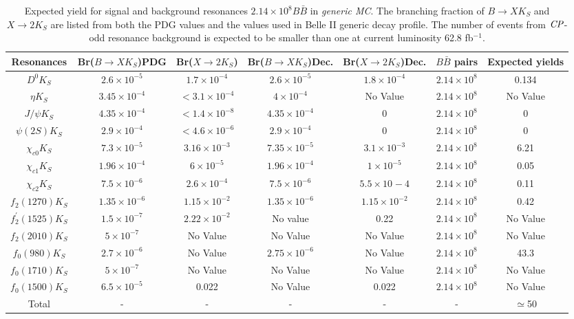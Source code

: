 \begin{table}
	\caption{Expected yield for signal and background resonances $2.14\times 10^8 B\bar{B}$ in \textit{generic MC}. The branching fraction of $B\to X K_S$ and $X \to 2K_S$ are listed from both the PDG values and the values used in Belle II generic decay profile. The number of events from $\it{CP}$-odd resonance background is expected to be smaller than one at current luminosity 62.8 fb$^{-1}$.}
	\label{tab:f_res}
	\centering
	\begin{tabular}{|c|c|c|c|c|c|c|}
		\hline
		Resonances & Br($B \to X K_S$)PDG  & Br($X \to2K_S$) & Br($B \to X K_S$)Dec. & Br($X \to2K_S$)Dec. & $B\bar{B}$ pairs & Expected yields \\
		\hline
		$D^0 K_S$ & $2.6 \times 10^{-5}$ & $1.7\times 10^{-4}$ & $2.6 \times 10^{-5}$ & $1.8\times 10^{-4}$ & $2.14\times 10^8$ & 0.134 \\
		\hline
		$\eta K_S$ & $3.45\times 10^{-4}$ & $<3.1\times 10^{-4}$ & $4\times 10^{-4}$ & No Value & $2.14\times 10^8$ & No Value  \\
		\hline
		$J/\psi K_S$ & $4.35\times 10^{-4}$ & $<1.4\times 10^{-8}$ & $4.35\times 10^{-4}$ & 0 & $2.14\times 10^8$ & 0 \\
		\hline
		$\psi(2S)K_S$ & $2.9\times 10^{-4}$ & $<4.6\times 10^{-6}$ & $2.9\times 10^{-4}$ & 0 & $2.14\times 10^8$ & 0 \\
		\hline
		$\chi_{c0}K_S$ & $7.3\times 10^{-5}$ & $3.16\times 10^{-3}$ & $7.35\times 10^{-5}$ & $3.1\times 10^{-3}$ & $2.14\times 10^8$ & 6.21 \\
		\hline
		$\chi_{c1}K_S$ & $1.96\times 10^{-4}$ & $6\times 10^{-5}$ & $1.96\times 10^{-4}$ & $1\times 10^{-5}$ & $2.14\times 10^8$ & 0.05 \\
		\hline
		$\chi_{c2}K_S$ & $7.5\times 10^{-6}$ & $2.6\times 10^{-4}$ & $7.5\times 10^{-6}$ & $5.5\times 10^{}-4$ & $2.14\times 10^8$ & 0.11 \\
		\hline
		$f_2(1270)K_S$ & $1.35\times 10^{-6}$ & $1.15\times 10^{-2}$ & $1.35\times 10^{-6}$ & $1.15\times 10^{-2}$ & $2.14\times 10^8$ & 0.42 \\
		\hline
		$f_{2}^{'}(1525)K_S$ & $1.5\times 10^{-7} $ & $2.22\times 10^{-2}$ & No value & 0.22 & $2.14\times 10^8$ & No Value \\
		\hline
		$f_2(2010)K_S$ & $5\times 10^{-7}$ & No Value  & No Value  & No Value  & $2.14\times 10^8$ & No Value \\
		\hline
		$f_0(980)K_S$ & $2.7\times 10^{-6}$ & No Value & $2.75\times 10^{-6}$ & No Value & $2.14\times 10^8$ & 43.3 \\
		\hline
		$f_0(1710)K_S$ & $5\times 10^{-7}$ & No Value  & No Value  & No Value  & $2.14\times 10^8$ & No Value \\
		\hline
		$f_0(1500)K_S$ & $6.5\times 10^{-5}$ & 0.022 & No Value & 0.022 & $2.14\times 10^8$ & No Value \\
		\hline
		Total  & - & - & - & - & - & $\simeq$50 \\
		\hline
	\end{tabular}
\end{table}


